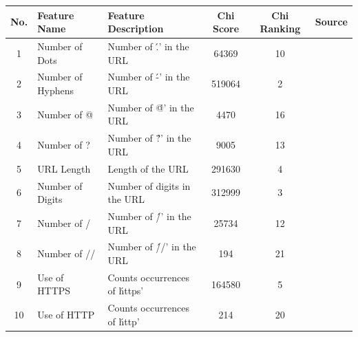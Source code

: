 \documentclass{article}
\begin{document}
    \begin{table}[h]
        \centering
        \begin{tabular}{|c|l|p{6cm}|c|c|l|}
            \hline
            \textbf{No.} & \textbf{Feature Name} & \textbf{Feature Description}                 & \textbf{Chi Score} & \textbf{Chi Ranking} & \textbf{Source} \\ \hline
            1            & Number of Dots        & Number of \'.' in the URL                    & 64369              & 10                   &    \cite{LexicalFeatureSelection}             \\ \hline
            2            & Number of Hyphens     & Number of \'-' in the URL                    & 519064             & 2                    &    \cite{PhishSafe} \cite{LexicalFeatureSelection}             \\ \hline
            3            & Number of @           & Number of \'@' in the URL                    & 4470               & 16                   &  \cite{PhishSafe}  \cite{LexicalFeatureSelection}            \\ \hline
            4            & Number of ?           & Number of \'?' in the URL                    & 9005               & 13                   &   \cite{LexicalFeatureSelection}              \\ \hline
            5            & URL Length            & Length of the URL                            & 291630             & 4                    &   \cite{PhishSafe} \cite{LexicalFeatureSelection}             \\ \hline
            6            & Number of Digits      & Number of digits in the URL                  & 312999             & 3                    &                 \\ \hline
            7            & Number of /           & Number of \'/' in the URL                    & 25734              & 12                   &    \cite{LexicalFeatureSelection}            \\ \hline
            8            & Number of //          & Number of \'//' in the URL                   & 194                & 21                   &   \cite{PhishSafe} \cite{LexicalFeatureSelection}             \\ \hline
            9            & Use of HTTPS          & Counts occurrences of \'https'               & 164580             & 5                    &   \cite{PhishSafe}              \\ \hline
            10           & Use of HTTP           & Counts occurrences of \'http'                & 214                & 20                   &  \cite{PhishSafe} \cite{LexicalFeatureSelection}               \\ \hline

\end{tabular}
\end{table}
\end{document}
